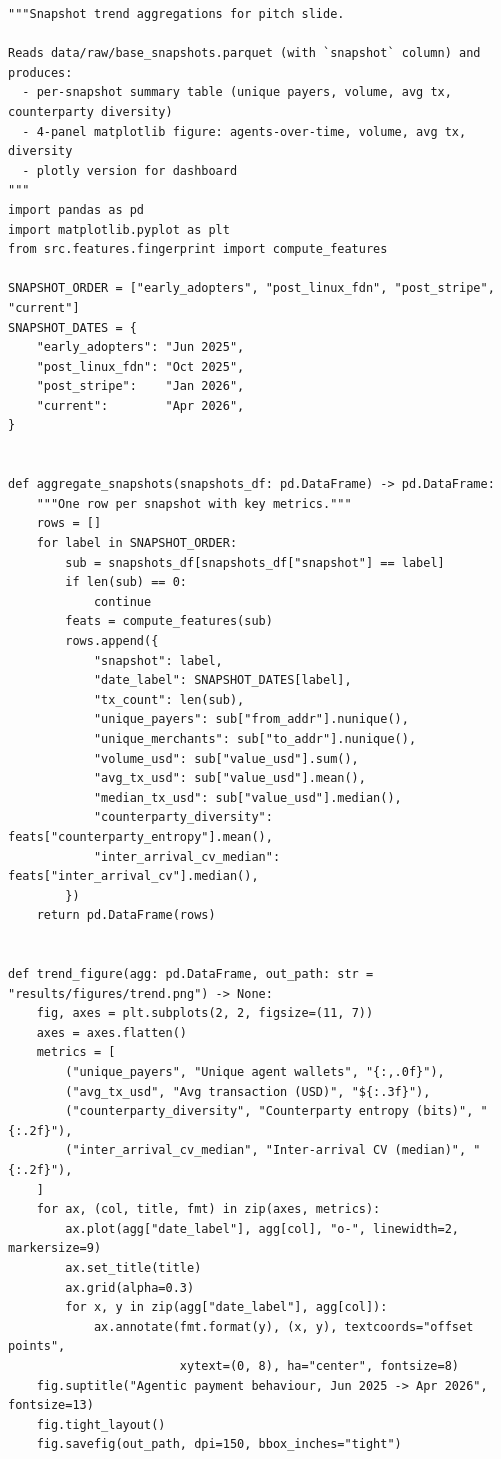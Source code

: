 \documentclass[11pt]{article}
\begin{document}
\begin{lstlisting}
"""Snapshot trend aggregations for pitch slide.

Reads data/raw/base_snapshots.parquet (with `snapshot` column) and produces:
  - per-snapshot summary table (unique payers, volume, avg tx, counterparty diversity)
  - 4-panel matplotlib figure: agents-over-time, volume, avg tx, diversity
  - plotly version for dashboard
"""
import pandas as pd
import matplotlib.pyplot as plt
from src.features.fingerprint import compute_features

SNAPSHOT_ORDER = ["early_adopters", "post_linux_fdn", "post_stripe", "current"]
SNAPSHOT_DATES = {
    "early_adopters": "Jun 2025",
    "post_linux_fdn": "Oct 2025",
    "post_stripe":    "Jan 2026",
    "current":        "Apr 2026",
}


def aggregate_snapshots(snapshots_df: pd.DataFrame) -> pd.DataFrame:
    """One row per snapshot with key metrics."""
    rows = []
    for label in SNAPSHOT_ORDER:
        sub = snapshots_df[snapshots_df["snapshot"] == label]
        if len(sub) == 0:
            continue
        feats = compute_features(sub)
        rows.append({
            "snapshot": label,
            "date_label": SNAPSHOT_DATES[label],
            "tx_count": len(sub),
            "unique_payers": sub["from_addr"].nunique(),
            "unique_merchants": sub["to_addr"].nunique(),
            "volume_usd": sub["value_usd"].sum(),
            "avg_tx_usd": sub["value_usd"].mean(),
            "median_tx_usd": sub["value_usd"].median(),
            "counterparty_diversity": feats["counterparty_entropy"].mean(),
            "inter_arrival_cv_median": feats["inter_arrival_cv"].median(),
        })
    return pd.DataFrame(rows)


def trend_figure(agg: pd.DataFrame, out_path: str = "results/figures/trend.png") -> None:
    fig, axes = plt.subplots(2, 2, figsize=(11, 7))
    axes = axes.flatten()
    metrics = [
        ("unique_payers", "Unique agent wallets", "{:,.0f}"),
        ("avg_tx_usd", "Avg transaction (USD)", "${:.3f}"),
        ("counterparty_diversity", "Counterparty entropy (bits)", "{:.2f}"),
        ("inter_arrival_cv_median", "Inter-arrival CV (median)", "{:.2f}"),
    ]
    for ax, (col, title, fmt) in zip(axes, metrics):
        ax.plot(agg["date_label"], agg[col], "o-", linewidth=2, markersize=9)
        ax.set_title(title)
        ax.grid(alpha=0.3)
        for x, y in zip(agg["date_label"], agg[col]):
            ax.annotate(fmt.format(y), (x, y), textcoords="offset points",
                        xytext=(0, 8), ha="center", fontsize=8)
    fig.suptitle("Agentic payment behaviour, Jun 2025 -> Apr 2026", fontsize=13)
    fig.tight_layout()
    fig.savefig(out_path, dpi=150, bbox_inches="tight")
\end{lstlisting}
\end{document}
